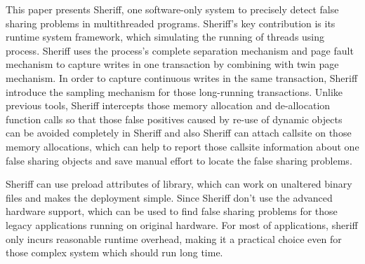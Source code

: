 \label{sec:conclusion}
This paper presents Sheriff, one software-only system to precisely detect false sharing problems
in multithreaded programs. 
Sheriff's key contribution is its runtime system framework, which simulating the running 
of threads using process. 
Sheriff uses the process's complete separation mechanism and page fault mechanism to capture writes
in one transaction by combining with twin page mechanism. 
In order to capture continuous writes in the same transaction, 
Sheriff introduce the sampling mechanism for those long-running
transactions. 
Unlike previous tools, Sheriff intercepts those memory allocation and de-allocation function calls so that
those false positives caused by re-use of dynamic objects can be avoided completely in Sheriff and also
Sheriff can attach callsite on those memory allocations, which can help to report those callsite 
information about one false sharing objects and save manual effort to locate the false sharing problems.

Sheriff can use preload attributes of library, which can work on unaltered binary files and makes the deployment
simple. Since Sheriff don't use the advanced hardware support, which can be used to find false sharing problems
for those legacy applications running on original hardware. 
For most of applications, sheriff only incurs reasonable runtime overhead, making it a 
practical choice even for those complex system which should run long time. 
